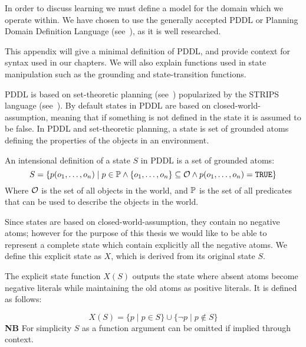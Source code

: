 \documentclass[../Master.tex]{subfiles}
\begin{document}
In order to discuss learning we must define a model for the domain which we operate within. We have chosen to use the generally accepted PDDL or Planning Domain Definition Language (see~\cite{PDDL}), as it is well researched.

This appendix will give a minimal definition of PDDL, and provide context for syntax used in our chapters. We will also explain functions used in state manipulation such as the grounding and state-transition functions.


PDDL is based on set-theoretic planning (see~\cite{ghallab2004a}) popularized by the STRIPS language (see~\cite{STRIPS}). By default states in PDDL are based on closed-world-assumption, meaning that if something is not defined in the state it is assumed to be false. 
In PDDL and set-theoretic planning, a state is set of grounded atoms defining the properties of the objects in an environment.

\begin{definition}[State] 
	An intensional definition of a state $S$ in PDDL is a set of grounded atoms:
    \begin{equation*}
        S=\{p(o_1,\dots,o_n) \mid  p \in \mathbb{P} \land \{o_1,\dots,o_n\} \subseteq \mathcal{O} \land p(o_1,\dots,o_n) = \texttt{TRUE}\}
    \end{equation*}
    Where $\mathcal{O}$ is the set of all objects in the world, and $\mathbb{P}$ is the set of all predicates that can be used to describe the objects in the world.
\end{definition}

Since states are based on closed-world-assumption, they contain no negative atoms; however for the purpose of this thesis we would like to be able to represent a complete state which contain explicitly all the negative atoms. 
We define this explicit state as $X$, which is derived from its original state $S$.
\begin{definition}\label{def:pddl:explicit-state}
	The explicit state function $X(S)$ outputs the state where absent atoms become negative literals while maintaining the old atoms as positive literals. It is defined as follows: 
	
	\begin{equation*}
	X(S)=\{p \mid p \in S \} \cup \{\neg p \mid  p \notin S \}
	\end{equation*}
	\textbf{NB} For simplicity $S$ as a function argument can be omitted if implied through context. 
\end{definition}
\end{document}

